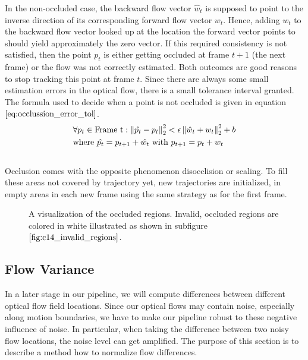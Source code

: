 In the non-occluded case, the backward flow vector $\hat{w}_t$ is supposed to point to the inverse direction of its corresponding forward flow vector $w_t$. Hence, adding $w_t$ to the backward flow vector looked up at the location the forward vector points to should yield approximately the zero vector. If this required consistency is not satisfied, then the point $p_t$ is either getting occluded at frame $t+1$ (the next frame) or the flow was not correctly estimated. Both outcomes are good reasons to stop tracking this point at frame $t$. Since there are always some small estimation errors in the optical flow, there is a small tolerance interval granted. The formula used to decide when a point is not occluded is given in equation $\ref{eq:occlussion_error_tol}$.
\begin{equation}
\begin{aligned}
& \forall p_t \in \text{Frame t}:	\left\lVert\hat{p_t}-p_t\right\rVert_2^2 < \epsilon \left\lVert\hat{w}_t + w_t\right\rVert_2^2 + b \\
& \text{where } \hat{p_t} = p_{t+1} + \hat{w_t} \text{ with } p_{t+1} = p_t + w_t
\end{aligned}
\label{eq:occlussion_error_tol}
\end{equation} \\
Occlusion comes with the opposite phenomenon disocclision or scaling. To fill these areas not covered by trajectory yet, new trajectories are initialized, in empty areas in each new frame using the same strategy as for the first frame.
\begin{figure}[H]
\begin{center}
\end{center}
\caption[Occluded Regions]{A visualization of the occluded regions. Invalid, occluded regions are colored in white illustrated as shown in subfigure $\ref{fig:c14_invalid_regions}$.}
\label{fig:invalid_regions}
\end{figure}

\subsection{Flow Variance}
\label{sec:flow_variance}
In a later stage in our pipeline, we will compute differences between different optical flow field locations. Since our optical flows may contain noise, especially along motion boundaries, we have to make our pipeline robust to these negative influence of noise. In particular, when taking the difference between two noisy flow locations, the noise level can get amplified. The purpose of this section is to describe a method how to normalize flow differences. 

